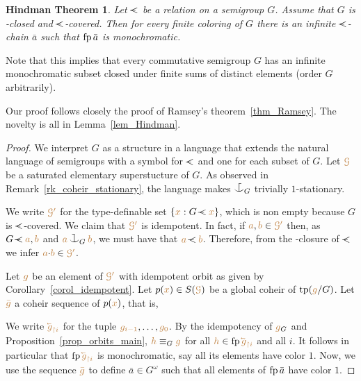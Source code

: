 \documentclass[creche.tex]{subfiles}
\begin{document}
\theoremstyle{mio}
\newtheorem{Hindman}[thm]{Hindman Theorem}
\begin{Hindman}\label{thm_Hindman}
Let $\cpaw$ be a relation on a semigroup $G$.
%
Assume that $G$ is  \cpawdot-closed and $\cpaw$-covered.
%
Then for every finite coloring of $G$ 
there is an infinite $\cpaw$-chain $\bar a$ such that ${\rm fp}\,\bar a$ is monochromatic.
\end{Hindman}

Note that this implies that every commutative semigroup $G$ has an infinite monochromatic subset 
closed under finite sums of distinct elements (order $G$ arbitrarily).

Our proof follows closely the proof of Ramsey's theorem~\ref{thm_Ramsey}.
%
The novelty is all in Lemma~\ref{lem_Hindman}.

\begin{proof}
We interpret $G$ as a structure in a language 
that extends the natural language of semigroups
with a symbol for $\cpaw$ and one for each subset of $G$.
%
Let ${\color{brown}\EuScript G}$ be a saturated elementary superstucture of $G$.
%
As observed in Remark~\ref{rk_coheir_stationary}, 
the language makes $\nonforkc_G$ trivially $1$-stationary.

We write ${\color{brown}\EuScript G'}$ for the type-definable set $\{{\mr x} : G\cpaw{\mr x}\}$,
which is non empty because $G$ is $\cpaw$-covered.
%
We claim that ${\color{brown}\EuScript G'}$ is idempotent.
%
In fact, if ${\color{brown} a},{\color{brown} b}\in{\color{brown}\EuScript G'}$ 
then, as $G\cpaw{\mr a},{\mr b}$ and ${\mr a}\cnonfork_G{\mr b}$, 
we must have that ${\mr a}\cpaw{\mr b}$.
%
Therefore, from the \cpawdot-closure of $\cpaw$ we infer ${\color{brown} a}{\cdot}{\color{brown} b}\in{\color{brown}\EuScript G'}$.

Let ${\color{brown} g}$ be an element of ${\color{brown}\EuScript G'}$ with idempotent orbit 
as given by Corollary~\ref{corol_idempotent}.
%
Let $p({\color{brown} x})\in S({\color{brown}\EuScript G})$ be a global coheir of ${\rm tp}({\color{brown} g}/G)$.
%
Let ${\color{brown}\bar g}$ a coheir sequence of $p({\color{brown} x})$, that is,


We write ${\mr \cev{g}_{\restriction i}}$ for the tuple ${\color{brown} g_{i-1}},\dots,{\color{brown} g_{0}}$.
%
By the idempotency of ${\color{brown} g}_G$ and Proposition~\ref{prop_orbits_main}, 
${\color{brown} h}\equiv_G{\color{brown} g}$ for all ${\mr h}\in \fp\,{\mr \cev{g}_{\restriction i}}$ and all $i$.
It follows in particular that $\fp\,{\mr \cev{g}_{\restriction i}}$ is monochromatic, 
say all its elements have color $1$.
%
Now, we use the sequence ${\color{brown}\bar g}$ to define $\bar a\in G^\omega$
such that all elements of ${\rm fp}\,\bar a$ have color $1$.


\end{proof}
\end{document}
